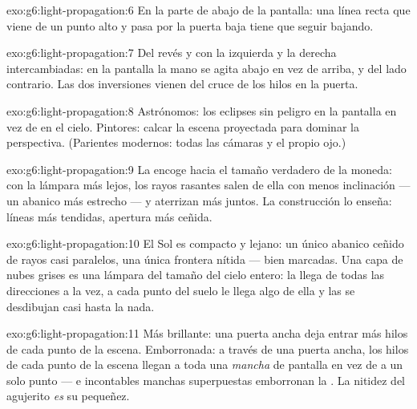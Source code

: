\begin{solution}{exo:g6:light-propagation:6}
En la parte de abajo de la pantalla: una línea recta que viene de un
punto alto y pasa por la puerta baja tiene que seguir bajando.
\end{solution}

\begin{solution}{exo:g6:light-propagation:7}
Del revés y con la izquierda y la derecha intercambiadas: en la
pantalla la mano se agita abajo en vez de arriba, y del lado
contrario. Las dos inversiones vienen del cruce de los hilos en la
puerta.
\end{solution}

\begin{solution}{exo:g6:light-propagation:8}
Astrónomos:  los eclipses sin peligro en la pantalla en vez de
en el cielo. Pintores: calcar la escena proyectada para dominar la
perspectiva. (Parientes modernos: todas las cámaras y el propio ojo.)
\end{solution}

\begin{solution}{exo:g6:light-propagation:9}
La  encoge hacia el tamaño verdadero de la moneda: con la
lámpara más lejos, los rayos rasantes salen de ella con menos
inclinación --- un abanico más estrecho --- y aterrizan más juntos. La
construcción lo enseña: líneas más tendidas, apertura más ceñida.
\end{solution}

\begin{solution}{exo:g6:light-propagation:10}
El Sol es compacto y lejano: un único abanico ceñido de rayos casi
paralelos, una única frontera nítida ---  bien marcadas. Una
capa de nubes grises es una lámpara del tamaño del cielo entero: la
 llega de todas las direcciones a la vez, a cada punto del suelo
le llega algo de ella y las  se desdibujan casi hasta la
nada.
\end{solution}

\begin{solution}{exo:g6:light-propagation:11}
Más brillante: una puerta ancha deja entrar más hilos de cada punto de
la escena. Emborronada: a través de una puerta ancha, los hilos de
cada punto de la escena llegan a toda una \emph{mancha} de pantalla en
vez de a un solo punto --- e incontables manchas superpuestas
emborronan la . La nitidez del agujerito \emph{es} su pequeñez.
\end{solution}

